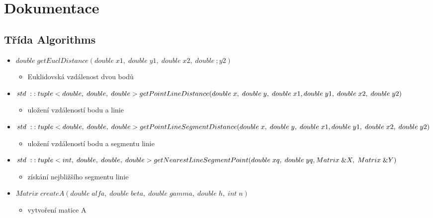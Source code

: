 \documentclass[oneside,12pt,a4paper]{book}
\begin{document}
\chapter{Dokumentace} 
\section{Třída Algorithms}
    \begin{itemize}
    \item $double \;getEuclDistance(double\; x1,\; double \; y1,\; double \; x2,\; double\ ; y2)$
        \begin{itemize}
        \item  Euklidovská vzdálenost dvou bodů
        \end{itemize}

    \item $std\;:\;:tuple<double,\; double,\; double> getPointLineDistance(double\; x,\; double\; y,\; double\; x1,\; \\double\; y1,\; double\; x2,\; double\; y2)$
        \begin{itemize}
        \item  uložení vzdáleností bodu a linie
        \end{itemize}

    \item $std\;:\;:tuple<double,\; double,\; double> getPointLineSegmentDistance(double\; x,\; double\; y,\; double\; x1,\; \\double\; y1,\; double\; x2,\; double\; y2)$
        \begin{itemize}
        \item  uložení vzdáleností bodu a segmentu linie
        \end{itemize}
        
    \item $std\;:\;:tuple<int,\; double,\; double,\; double> getNearestLineSegmentPoint(double\; xq,\; double\; yq,\; \\Matrix\; \&X,\; Matrix\; \&Y)$
        \begin{itemize}
        \item  získání nejbližšího segmentu linie
        \end{itemize}

    \item $Matrix\; createA(double\; alfa,\; double\; beta,\; double\; gamma,\; double\; h,\; int\; n)$
        \begin{itemize}
            \item  vytvoření matice A
        \end{itemize}


\end{itemize}
\end{document}
